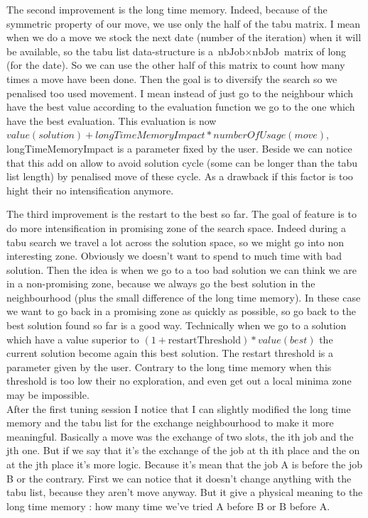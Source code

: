 \documentclass[12pt,a4paper]{article}
\begin{document}
The second improvement is the long time memory. Indeed, because of the symmetric property of our move, we use only the half of the tabu matrix. I mean when we do a move we stock the next date (number of the iteration) when it will be available, so the tabu list data-structure is a $\text{nbJob} \times \text{nbJob}$ matrix of long (for the date). So we can use the other half of this matrix to count how many times a move have been done. Then the goal is to diversify the search so we penalised too used movement. I mean instead of just go to the neighbour which have the best value according to the evaluation function we go to the one which have the best evaluation. This evaluation is now $value(solution) + longTimeMemoryImpact*numberOfUsage(move)$, longTimeMemoryImpact is a parameter fixed by the user. Beside we can notice that this add on allow to avoid solution cycle (some can be longer than the tabu list length) by penalised move of these cycle. As a drawback if this factor is too hight their no intensification anymore.

The third improvement is the restart to the best so far. The goal of feature is to do more intensification in promising zone of the search space. Indeed during a tabu search we travel a lot across the solution space, so we might go into non interesting zone. Obviously we doesn't want to spend to much time with bad solution. Then the idea is when we go to a too bad solution we can think we are in a non-promising zone, because we always go the best solution in the neighbourhood (plus the small difference of the long time memory). In these case we want to go back in a promising zone as quickly as possible, so go back to the best solution found so far is a good way. Technically when we go to a solution which have a value superior to $(1 + \text{restartThreshold}) * value(best)$ the current solution become again this best solution. The restart threshold is a parameter given by the user. Contrary to the long time memory when this threshold is too low their no exploration, and even get out a local minima zone may be impossible.\\

After the first tuning session I notice that I can slightly modified the long time memory and the tabu list for the exchange neighbourhood to make it more meaningful. Basically a move was the exchange of two slots, the ith job and the jth one. But if we say that it's the exchange of the job at th ith place and the on at the jth place it's more logic. Because it's mean that the job A is before the job B or the contrary. First we can notice that it doesn't change anything with the tabu list, because they aren't move anyway. But it give a physical meaning to the long time memory : how many time we've tried A before B or B before A.
\end{document}
